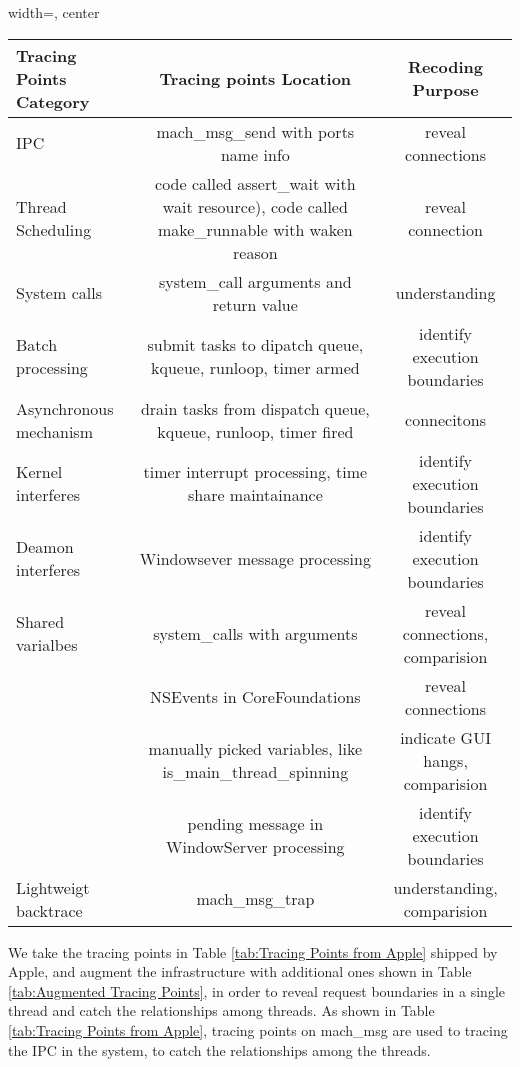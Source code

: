 \begin{table*}[h]
\begin{adjustbox}{width=, center}
\centering
\begin{tabular}{|l|c|c|}
\hline
Tracing Points Category & Tracing points Location & Recoding Purpose\\
\hline
\hline
IPC & mach\_msg\_send with ports name info & reveal connections\\
\hline
Thread Scheduling & code called assert\_wait with wait resource), code called make\_runnable with waken reason & reveal connection\\
\hline
System calls & system\_call arguments and return value & understanding\\
\hline
Batch processing & submit tasks to dipatch queue, kqueue, runloop, timer armed & identify execution boundaries\\
\hline
Asynchronous mechanism & drain tasks from dispatch queue, kqueue, runloop, timer fired& connecitons\\
\hline
Kernel interferes & timer interrupt processing, time share maintainance & identify execution boundaries\\
\hline
Deamon interferes & Windowsever message processing & identify execution boundaries\\
\hline
Shared varialbes & system\_calls with arguments & reveal connections, comparision\\
	& NSEvents in CoreFoundations & reveal connections\\
	& manually picked variables, like is\_main\_thread\_spinning & indicate GUI hangs, comparision\\
	& pending message in WindowServer processing & identify execution boundaries\\
\hline
Lightweigt backtrace & mach\_msg\_trap & understanding, comparision\\
\hline
\end{tabular}
\end{adjustbox}
\caption{Augmented Tracing Points}
\label{tab:Augmented Tracing Points}
\end{table*}
We take the tracing points in Table \ref{tab:Tracing Points from Apple} shipped by Apple, and augment the infrastructure with additional ones shown in Table \ref{tab:Augmented Tracing Points}, in order to reveal request boundaries in a single thread and catch the relationships among threads.
As shown in Table \ref{tab:Tracing Points from Apple}, tracing points on mach\_msg are used to tracing the IPC in the system, to catch the relationships among the threads.
